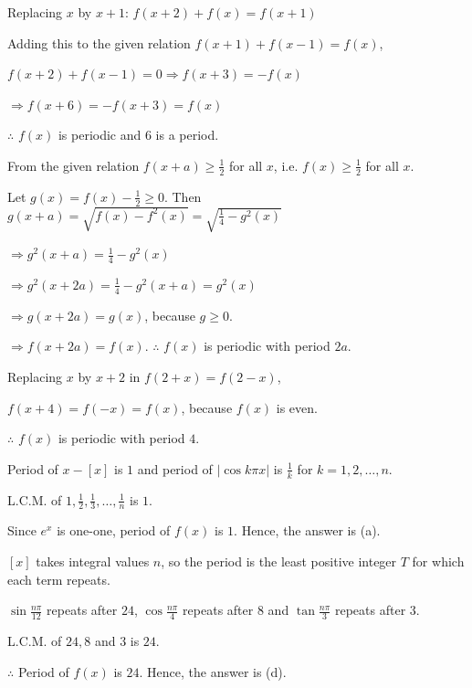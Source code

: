 \item Replacing $x$ by $x + 1$: $f(x + 2) + f(x) = f(x + 1)$

  Adding this to the given relation $f(x + 1) + f(x - 1) = f(x)$,

  $f(x + 2) + f(x - 1) = 0 \Rightarrow f(x + 3) = -f(x)$

  $\Rightarrow f(x + 6) = -f(x + 3) = f(x)$

  $\therefore$ $f(x)$ is periodic and $6$ is a period.

\item From the given relation $f(x + a)\geq\frac{1}{2}$ for all $x$, i.e. $f(x)\geq\frac{1}{2}$ for
  all $x$.

  Let $g(x) = f(x) - \frac{1}{2}\geq 0$. Then $g(x + a) = \sqrt{f(x) - f^2(x)} = \sqrt{\frac{1}{4} -
  g^2(x)}$

  $\Rightarrow g^2(x + a) = \frac{1}{4} - g^2(x)$

  $\Rightarrow g^2(x + 2a) = \frac{1}{4} - g^2(x + a) = g^2(x)$

  $\Rightarrow g(x + 2a) = g(x)$, because $g\geq 0$.

  $\Rightarrow f(x + 2a) = f(x)$. $\therefore$ $f(x)$ is periodic with period $2a$.

\item Replacing $x$ by $x + 2$ in $f(2 + x) = f(2 - x)$,

  $f(x + 4) = f(-x) = f(x)$, because $f(x)$ is even.

  $\therefore$ $f(x)$ is periodic with period $4$.

\item Period of $x - [x]$ is $1$ and period of $|\cos k\pi x|$ is $\frac{1}{k}$ for $k = 1, 2,
  \ldots, n$.

  L.C.M. of $1, \frac{1}{2}, \frac{1}{3}, \ldots, \frac{1}{n}$ is $1$.

  Since $e^x$ is one-one, period of $f(x)$ is $1$. Hence, the answer is (a).

\item $[x]$ takes integral values $n$, so the period is the least positive integer $T$ for which
  each term repeats.

  $\sin\frac{n\pi}{12}$ repeats after $24$, $\cos\frac{n\pi}{4}$ repeats after $8$ and
  $\tan\frac{n\pi}{3}$ repeats after $3$.

  L.C.M. of $24, 8$ and $3$ is $24$.

  $\therefore$ Period of $f(x)$ is $24$. Hence, the answer is (d).

